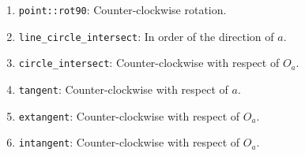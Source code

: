 \begin{enumerate}
\item \texttt{point::rot90}: Counter-clockwise rotation.
\item \texttt{line\_circle\_intersect}: In order of the direction of $a$.
\item \texttt{circle\_intersect}: Counter-clockwise with respect of $O_a$.
\item \texttt{tangent}: Counter-clockwise with respect of $a$.
\item \texttt{extangent}: Counter-clockwise with respect of $O_a$.
\item \texttt{intangent}: Counter-clockwise with respect of $O_a$.
\end{enumerate}

